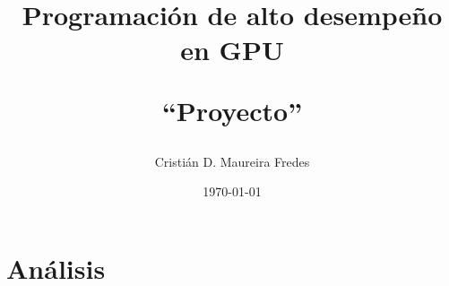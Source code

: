 \documentclass[letter, 10pt]{article}
\begin{document}
\pagestyle{empty}

\title{Programación de alto desempeño en GPU\\ \begin{Large}``Proyecto''\end{Large}}
\author{Cristián D. Maureira Fredes}
\date{\today}
\maketitle

\section{Análisis}
\label{sec:analisis}

\end{document}
